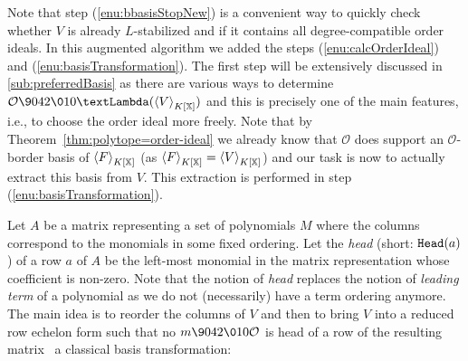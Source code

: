 \documentclass[11pt,oneside,english]{amsart}
\makeatletter
\numberwithin{equation}{section}
\numberwithin{figure}{section}
\theoremstyle{plain}
\theoremstyle{definition}
\theoremstyle{definition}
\theoremstyle{remark}
\theoremstyle{plain}
\theoremstyle{plain}
\theoremstyle{plain}
\theoremstyle{problem@}
\makeatother
\begin{document}
Note that step (\ref{enu:bbasisStopNew})
is a convenient way to quickly check whether $V$ is already
$L$-stabilized and if it contains all degree-compatible order ideals. In this
augmented algorithm we added the steps (\ref{enu:calcOrderIdeal}) and
(\ref{enu:basisTransformation}). The first step will be extensively discussed
in \autoref{sub:preferredBasis} as there are various ways to determine ${\mathcal{O}}
{\9042\010} {\textLambda}({{\left\langle {V}\right\rangle}\sb{K[\mathbb{X}]}})$ and this is precisely one of the main features, i.e.,
to choose the order ideal more freely. Note that by
Theorem~\ref{thm:polytope=order-ideal} we
already know that ${\mathcal{O}}$ does support an ${\mathcal{O}}$-border basis of ${{\left\langle {F}\right\rangle}\sb{K[\mathbb{X}]}}$ (as
${{\left\langle {F}\right\rangle}\sb{K[\mathbb{X}]}} = {{\left\langle {V}\right\rangle}\sb{K[\mathbb{X}]}}$) and our task is now to actually extract this basis
from $V$. This extraction is performed in step
(\ref{enu:basisTransformation}).

Let $A$ be a matrix representing a set of polynomials $M$ where the columns
correspond to the monomials in some fixed ordering.
Let the \emph{head} (short: ${\ensuremath{\operatorname{{\textnormal{\texttt{{Head}}}}}}}(a)$) of a row $a$ of $A$ be
the left-most monomial in
the matrix representation whose coefficient is non-zero. Note that the notion
of \emph{head} replaces the notion of \emph{leading term} of a polynomial as we
do not (necessarily) have a term ordering anymore.  The main idea is to
reorder the columns of $V$ and then to
bring $V$ into a reduced row echelon form such that
no $m {\9042\010} {\mathcal{O}}$ is head of a row of the resulting matrix
\textemdash\ a classical basis transformation:
\end{document}
